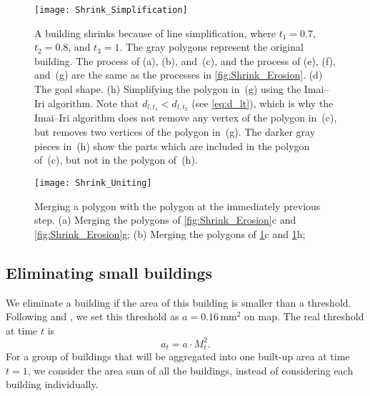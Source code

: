 \begin{figure}[tb]
	\centering
	\texttt{[image: Shrink\_Simplification]}
	\caption{A building shrinks because of line simplification, 
		where $t_1=0.7$, $t_2=0.8$, and $t_3=1$.
		The gray polygons represent the original building.
		The process of (a), (b), and~(c), and 
		the process of (e), (f), and~(g) are the same as 
		the processes in \fig\ref{fig:Shrink_Erosion}.
		(d) The goal shape.
		(h) Simplifying the polygon in~(g) using the Imai--Iri algorithm.
		Note that $d_{l,t_1}<d_{l,t_2}$ (see \eq\ref{eq:d_lt}),
		which is why the Imai--Iri algorithm does not 
		remove any vertex of the polygon in~(c),
		but removes two vertices of the polygon in~(g).
		The darker gray pieces in~(h) show 
		the parts which are included in the polygon of~(c), 
		but not in the polygon of~(h).
	}
	\label{fig:Shrink_Simplification}
\end{figure}

\begin{figure}[tb]
	\centering
	\texttt{[image: Shrink\_Uniting]}
	\caption{Merging a polygon with the polygon at the immediately previous 
	step.
		(a) Merging the polygons of \fig\ref{fig:Shrink_Erosion}c and 
		\fig\ref{fig:Shrink_Erosion}g;
		(b) Merging the polygons of \fig\ref{fig:Shrink_Simplification}c and 
		\fig\ref{fig:Shrink_Simplification}h;
	}
	\label{fig:Shrink_Uniting}
\end{figure}




\subsection{Eliminating small buildings}
\label{sec:Eliminate}
We eliminate a building if the area of this building is smaller than a 
threshold.
Following \citet{Stoter2009} and \citet{Chaudhry2008}, 
we set this threshold as $a=0.16\,\mathrm{mm}^2$ on map.
The real threshold at time $t$ is
\[
a_t=a\cdot M_t^2.
\]
For a group of buildings that will be aggregated into one built-up area at time 
$t=1$, we consider the area sum of all the buildings, 
instead of considering each building individually.



